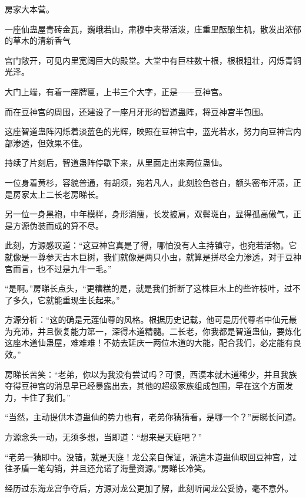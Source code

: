 
\begin{this_body}



房家大本营。

一座仙蛊屋青砖金瓦，巍峨若山，肃穆中夹带活泼，庄重里酝酿生机，散发出浓郁的草木的清新香气

宫门敞开，可见内里宽阔巨大的殿堂。大堂中有巨柱数十根，根根粗壮，闪烁青铜光泽。

大门上端，有着一座牌匾，上书三个大字，正是——豆神宫。

而在豆神宫的周围，还建设了一座月牙形的智道蛊阵，将豆神宫半包围。

这座智道蛊阵闪烁着淡蓝色的光辉，映照在豆神宫中，蓝光若水，努力向豆神宫内部渗透，但效果不佳。

持续了片刻后，智道蛊阵停歇下来，从里面走出来两位蛊仙。

一位身着黄杉，容貌普通，有胡须，宛若凡人，此刻脸色苍白，额头密布汗渍，正是房家太上二长老房睇长。

另一位一身黑袍，中年模样，身形消瘦，长发披肩，双鬓斑白，显得孤高傲气，正是方源伪装而成的算不尽。

此刻，方源感叹道：“这豆神宫真是了得，哪怕没有人主持镇守，也宛若活物。它就像是一尊参天古木巨树，我们就像是两只小虫，就算是拼尽全力渗透，对于豆神宫而言，也不过是九牛一毛。”

“是啊。”房睇长点头，“更糟糕的是，就是我们折断了这株巨木上的些许枝叶，过不了多久，它就能重现生长起来。”

方源分析：“这的确是元莲仙尊的风格。根据历史记载，他可是历代尊者中仙元最为充沛，并且恢复能力第一，深得木道精髓。二长老，你我都是智道蛊仙，要炼化这座木道仙蛊屋，难难难！不妨去延庆一两位木道的大能，配合我们，必定能有良效。”

房睇长苦笑：“老弟，你以为我没有尝试吗？可恨，西漠本就木道稀少，并且我族夺得豆神宫的消息早已经暴露出去，其他的超级家族组成包围，早在这个方面发力，卡住了我们。”

“当然，主动提供木道蛊仙的势力也有，老弟你猜猜看，是哪一个？”房睇长问道。

方源念头一动，无须多想，当即道：“想来是天庭吧？”

“老弟一猜即中。没错，就是天庭！龙公亲自保证，派遣木道蛊仙取回豆神宫，过往矛盾一笔勾销，并且还允诺了海量资源。”房睇长冷笑。

经历过东海龙宫争夺后，方源对龙公更加了解，此刻听闻龙公妥协，毫不意外。


\end{this_body}
